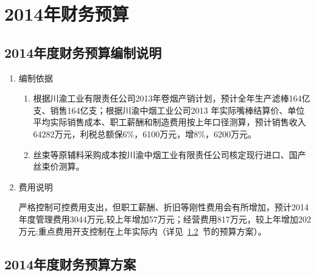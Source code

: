﻿\chapter{2014年财务预算}
\section{2014年度财务预算编制说明}

\renewcommand{\labelenumi}{\indent （\chinese{enumi}）}
\begin{enumerate}
\setlength{\itemindent}{1.3em} %
 \setlength{\topsep}{1ex} %
 \setlength{\itemsep}{0.5ex} %

\item 编制依据
  \begin{enumerate}[1、]
\item 根据川渝工业有限责任公司2013年卷烟产销计划，预计全年生产滤棒164亿支、销售164亿支；根据川渝中烟工业公司2013 年实际嘴棒结算价、单位平均实际销售成本、职工薪酬和制造费用按上年口径测算，预计销售收入64282万元，利税总额保6\%，6100万元，增8\%，6200万元。

\item 丝束等原辅料采购成本按川渝中烟工业有限责任公司核定现行进口、国产丝束价测算。
\end{enumerate}

\item 费用说明

严格控制可控费用支出，但职工薪酬、折旧等刚性费用会有所增加，预计2014年度管理费用3044万元,较上年增加57万元；经营费用817万元，较上年增加202万元;重点费用开支控制在上年实际内（详见~\ref{section:Budge}~节的预算方案）。
\end{enumerate}
\section{2014年度财务预算方案}\label{section:Budge}
